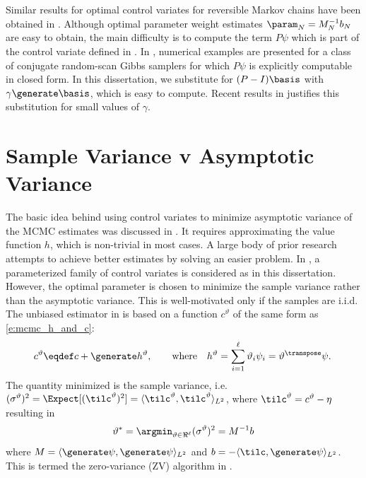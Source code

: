 Similar results for optimal control variates for reversible Markov chains have been obtained in \cite{delkon12}. Although optimal parameter weight estimates $\param_N = M_N^{-1} b_N$ are easy to obtain, the main difficulty is to compute the term $P\psi$ which is part of the control variate defined in . In \cite{delkon12}, numerical examples are presented for a class of conjugate random-scan Gibbs samplers for which $P\psi$ is explicitly computable in closed form. In this dissertation, we substitute for $(P-I)\basis$ with $\gamma \generate \basis$, which is easy to compute. Recent results in \cite{brodurmeymourad18} justifies this substitution for small values of $\gamma$. 

\section{Sample Variance v Asymptotic Variance}
\label{s:mcmc_var_vs_asym_var}
The basic idea behind using control variates to minimize asymptotic variance of the MCMC estimates was discussed in . It requires approximating the value function $h$, which is non-trivial in most cases. A large body of prior research \cite{oatgircho,papmirgir14} attempts to achieve better estimates by solving an easier problem. In \cite{papmirgir14}, a parameterized family of control variates is considered as in this dissertation. However, the optimal parameter is chosen to minimize the sample variance rather than the asymptotic variance. This is well-motivated only  if the samples are i.i.d. 
The unbiased estimator in \cite{papmirgir14} is based on a function $c^{\vartheta}$ of the same form as \eqref{e:mcmc_h_and_c}:
\[
\begin{aligned}
c^\vartheta  \eqdef c + \generate h^\vartheta,
\qquad
\text{where}
\quad
h^\vartheta  =  \sum_{i=1}^\ell \vartheta_i \psi_i = \vartheta^\transpose \psi.\,
\end{aligned}
\]
The quantity minimized is the sample variance, i.e. $(\sigma^\vartheta)^2 = \Expect[(\tilc^{\vartheta})^2] = \langle \tilc^\vartheta, \tilc^\vartheta \rangle_{L^2}$, where $\tilc^\vartheta = c^\vartheta - \eta$ resulting in
\begin{equation}
\vartheta^*= \argmin_{\vartheta \in \Re^\ell} (\sigma^\vartheta)^2  = M^{-1} b
\label{e:optVar}
\end{equation}
where $M = \langle \generate \psi,  \generate \psi \rangle_{L^2}$ and $b = - \langle \tilc, \generate \psi \rangle_{L^2}$. This is termed the zero-variance (ZV) algorithm in \cite{papmirgir14}.

